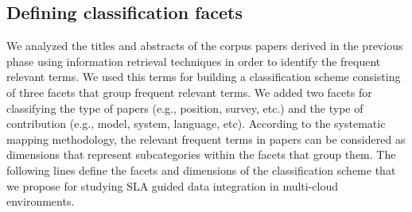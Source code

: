 
\subsection{Defining classification facets}

We analyzed the titles and abstracts of the corpus papers derived in the previous phase using information retrieval techniques in order to identify the frequent relevant terms. We used this terms for building a classification scheme consisting of three facets that group frequent relevant terms. We added two facets for classifying the type of papers (e.g., position, survey, etc.) and the type of contribution (e.g., model, system, language, etc). According to the systematic mapping methodology, the relevant frequent terms in papers can be considered as dimensions that represent subcategories within the facets that group them. The following lines define the facets and dimensions of the classification scheme that we propose for studying SLA guided data integration in multi-cloud environments.

